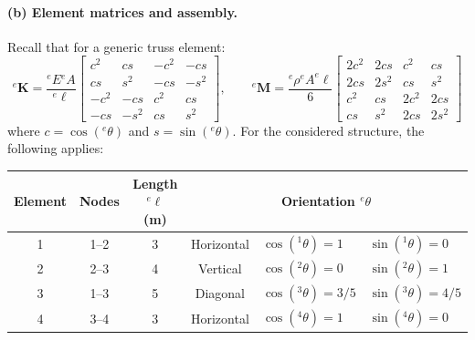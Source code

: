 \documentclass[12pt]{article}
\begin{document}
\paragraph*{(b) Element matrices and assembly.} Recall that for a generic truss element:
\[
	^{e}\mathbf{K} = \frac{{}^{e}E{}^{e}A}{^{e}\ell}
	\begin{bmatrix}
		c^2  & cs   & -c^2 & -cs  \\
		cs   & s^2  & -cs  & -s^2 \\
		-c^2 & -cs  & c^2  & cs   \\
		-cs  & -s^2 & cs   & s^2
	\end{bmatrix},\qquad
	^{e}\mathbf{M} = \frac{^{e}\rho ^{e}A ^{e}\ell}{6}
	\begin{bmatrix}
		2c^2 & 2cs  & c^2  & cs   \\
		2cs  & 2s^2 & cs   & s^2  \\
		c^2  & cs   & 2c^2 & 2cs  \\
		cs   & s^2  & 2cs  & 2s^2
	\end{bmatrix}
\]
where $c=\cos({}^e\theta)$ and $s=\sin({}^e\theta)$. For the considered structure, the following applies:
\begin{table}[h!]
	\centering
	\begin{tabular}{|c|c|c|c|ll|}
		\hline
		\textbf{Element} & \textbf{Nodes} & \textbf{Length ${}^e\ell$ (m)} & \multicolumn{3}{|c|}{\textbf{Orientation ${}^e\theta$ }}                                                       \\
		\hline
		1                & 1–2            & 3                              & Horizontal                                               & $\cos({}^1\theta) = 1$    & $\sin({}^1\theta) = 0$  \\
		2                & 2–3            & 4                              & Vertical                                                 & $\cos({}^2\theta) = 0$    & $\sin({}^2\theta) = 1$  \\
		3                & 1–3            & 5                              & Diagonal                                                 & $\cos({}^3\theta)  = 3/5$ & $\sin({}^3\theta) =4/5$ \\
		4                & 3–4            & 3                              & Horizontal                                               & $\cos({}^4\theta) = 1$    & $\sin({}^4\theta) = 0$  \\
		\hline
	\end{tabular}
\end{table}
\end{document}
